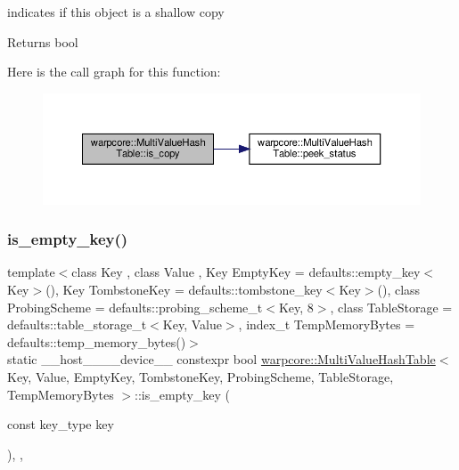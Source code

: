 indicates if this object is a shallow copy 

\begin{DoxyReturn}{Returns}
{\ttfamily bool} 
\end{DoxyReturn}
Here is the call graph for this function\+:
\nopagebreak
\begin{figure}[H]
\begin{center}
\leavevmode
\includegraphics[width=350pt]{classwarpcore_1_1MultiValueHashTable_a5ab9221422cf32364464b44be66075dd_cgraph}
\end{center}
\end{figure}
\mbox{\label{classwarpcore_1_1MultiValueHashTable_a23d1ba2d5e85a2465685f353ee5d0872}} 
\subsubsection{\texorpdfstring{is\+\_\+empty\+\_\+key()}{is\_empty\_key()}}
{\footnotesize\ttfamily template$<$class Key , class Value , Key Empty\+Key = defaults\+::empty\+\_\+key$<$\+Key$>$(), Key Tombstone\+Key = defaults\+::tombstone\+\_\+key$<$\+Key$>$(), class Probing\+Scheme  = defaults\+::probing\+\_\+scheme\+\_\+t$<$\+Key, 8$>$, class Table\+Storage  = defaults\+::table\+\_\+storage\+\_\+t$<$\+Key, Value$>$, index\+\_\+t Temp\+Memory\+Bytes = defaults\+::temp\+\_\+memory\+\_\+bytes()$>$ \\
static \+\_\+\+\_\+host\+\_\+\+\_\+\+\_\+\+\_\+device\+\_\+\+\_\+ constexpr bool \hyperlink{classwarpcore_1_1MultiValueHashTable}{warpcore\+::\+Multi\+Value\+Hash\+Table}$<$ Key, Value, Empty\+Key, Tombstone\+Key, Probing\+Scheme, Table\+Storage, Temp\+Memory\+Bytes $>$\+::is\+\_\+empty\+\_\+key (\begin{DoxyParamCaption}\item[{const key\+\_\+type}]{key }\end{DoxyParamCaption})\hspace{0.3cm}{\ttfamily [inline]}, {\ttfamily [static]}, {\ttfamily [noexcept]}}



